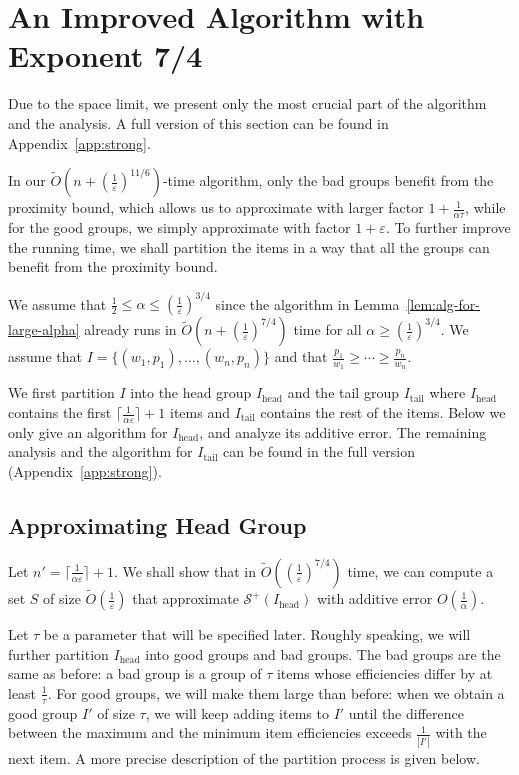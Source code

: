 \documentclass[a4paper,UKenglish,cleveref, autoref, thm-restate, pdfa]{lipics-v2021}
\newcommand{\eps}{\varepsilon}
\renewcommand{\leq}{\leqslant}
\renewcommand{\geq}{\geqslant}
\begin{document}
\section{An Improved Algorithm with Exponent 7/4}\label{sec:strong}
Due to the space limit, we present only the most crucial part of the algorithm and the analysis. A full version of this section can be found in Appendix~\ref{app:strong}.

In our $\tilde{O}(n + (\frac{1}{\eps})^{11/6})$-time algorithm, only the bad groups benefit from the proximity bound, which allows us to approximate with larger factor $1 + \frac{1}{\alpha\tau}$, while for the good groups, we simply approximate with factor $1 + \eps$. To further improve the running time, we shall partition the items in a way that all the groups can benefit from the proximity bound.

We assume that $\frac{1}{2}\leq \alpha \leq (\frac{1}{\eps})^{3/4}$ since the algorithm in Lemma~\ref{lem:alg-for-large-alpha} already runs in $\tilde{O}(n + (\frac{1}{\eps})^{7/4})$ time for all $\alpha \geq (\frac{1}{\eps})^{3/4}$. We assume that $I = \{(w_1, p_1), \ldots, (w_n, p_n)\}$ and that $\frac{p_1}{w_1} \geq \cdots \geq \frac{p_n}{w_n}$.

We first partition $I$ into the head group $I_{\mathrm{head}}$ and the tail group $I_{\mathrm{tail}}$ where $I_{\mathrm{head}}$ contains the first $\lceil \frac{1}{\alpha\eps}\rceil + 1 $ items and $I_{\mathrm{tail}}$ contains the rest of the items. 
Below we only give an algorithm for $I_{\mathrm{head}}$, and analyze its additive error. The remaining analysis and the algorithm for $I_{\mathrm{tail}}$ can be found in the full version (Appendix~\ref{app:strong}).

\subsection{Approximating Head Group}\label{sec:strong-head-incomp}
Let $n' = \lceil \frac{1}{\alpha\eps}\rceil + 1$.  We shall show that in $\tilde{O}((\frac{1}{\eps})^{7/4})$ time, we can compute a set $S$ of size $\tilde{O}(\frac{1}{\eps})$ that approximate $\mathcal{S}^+(I_{\mathrm{head}})$ with additive error $O(\frac{1}{\alpha})$.

Let $\tau$ be a parameter that will be specified later. Roughly speaking, we will further partition $I_{\mathrm{head}}$ into good groups and bad groups. The bad groups are the same as before: a bad group is a group of $\tau$ items whose efficiencies differ by at least $\frac{1}{\tau}$. For good groups, we will make them large than before: when we obtain a good group $I'$ of size $\tau$, we will keep adding items to $I'$ until the difference between the maximum and the minimum item efficiencies exceeds $\frac{1}{|I'|}$ with the next item. A more precise description of the partition process is given below. 
\end{document}
